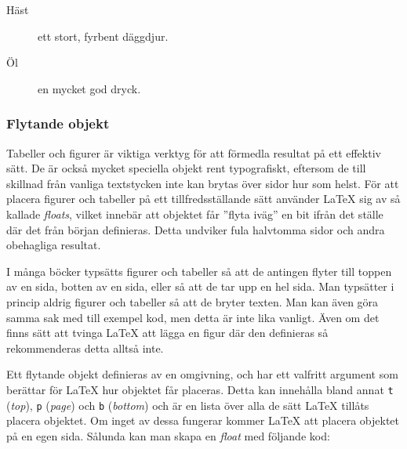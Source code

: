 \documentclass[../../latex.tex]{subfiles}
\begin{document}
\begin{kod}[tp]
{\begin{minipage}{0.475\textwidth}
\begin{latexcode}
\begin{description}
\item[Häst] ett stort,
    fyrbent däggdjur.
\item[Öl] en mycket god
    dryck.
\end{description}
			\end{latexcode}
		\end{minipage}
		\hfil
		\begin{minipage}{0.475\textwidth} %
		\end{minipage}
	}
	\caption{De tre enkla listomgivningar \LaTeX{} tillhandahåller.}
	\label{ex:listor}
\end{kod}

\subsubsection{Flytande objekt }\label{sec:floats}
Tabeller och figurer är viktiga verktyg för att förmedla resultat på
ett effektiv sätt. De är också mycket speciella objekt rent typografiskt,
eftersom de till skillnad från vanliga textstycken inte kan brytas över
sidor hur som helst. För att placera figurer och tabeller på ett
tillfredsställande sätt använder \LaTeX{} sig av så kallade \emph{floats},
vilket innebär att objektet får ”flyta iväg” en bit ifrån det ställe där
det från början definieras. Detta undviker fula halvtomma sidor och andra
obehagliga resultat.

I många böcker typsätts figurer och tabeller så att de antingen flyter
till toppen av en sida, botten av en sida, eller så att de tar upp en hel
sida. Man typsätter i princip aldrig figurer och tabeller så att de bryter
texten. Man kan även göra samma sak med till exempel kod, men detta är
inte lika vanligt. Även om det finns sätt att tvinga \LaTeX{} att lägga en
figur där den definieras så rekommenderas detta alltså inte.

Ett flytande objekt definieras av en omgivning, och har ett valfritt
argument som berättar för \LaTeX{} hur objektet får placeras. Detta kan
innehålla bland annat \texttt{t} (\emph{top}), \texttt{p} (\emph{page})
och \texttt{b} (\emph{bottom}) och är en lista över alla de sätt \LaTeX{}
tillåts placera objektet. Om inget av dessa fungerar kommer \LaTeX{} att
placera objektet på en egen sida. Sålunda kan man skapa en \emph{float}
med följande kod:
\begin{latexcode}
\begin{<floattyp>}[tbp] %
\end{<floattyp>}
\end{latexcode}
\end{document}
